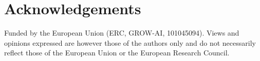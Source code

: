 \documentclass[letterpaper]{article}
\newif\ifanonymous
\begin{document}

        

\ifanonymous\else
\section{Acknowledgements}
Funded by the European Union (ERC, GROW-AI, 101045094). Views and opinions expressed are however those of the authors only and do not necessarily reflect those of the European Union or the European Research Council. 
\fi

\footnotesize

\end{document}
